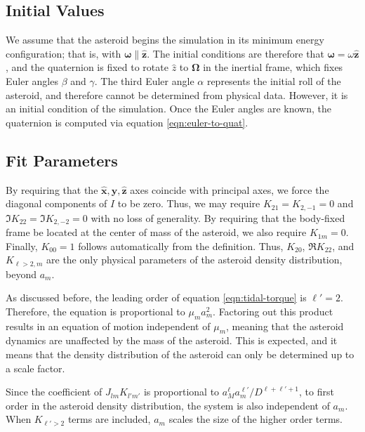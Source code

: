\documentclass[11pt]{article}
\newcommand{\unit}[1]{\hat{\mathbf{#1}}}
\begin{document}
\subsection{Initial Values}
We assume that the asteroid begins the simulation in its minimum energy configuration; that is, with $\bm \omega \parallel \unit z$. The initial conditions are therefore that $\bm \omega = \omega \unit z$, and the quaternion is fixed to rotate $\hat z$ to $\bm \Omega$ in the inertial frame, which fixes Euler angles $\beta$ and $\gamma$. The third Euler angle $\alpha$ represents the initial roll of the asteroid, and therefore cannot be determined from physical data. However, it is an initial condition of the simulation. Once the Euler angles are known, the quaternion is computed via equation \ref{eqn:euler-to-quat}.


\subsection{Fit Parameters}
By requiring that the $\unit x, \unit y, \unit z$ axes coincide with principal axes, we force the diagonal components of $I$ to be zero. Thus, we may require $K_{21}=K_{2,-1}=0$ and $\Im K_{22}=\Im K_{2,-2}=0$ with no loss of generality. By requiring that the body-fixed frame be located at the center of mass of the asteroid, we also require $K_{1m}=0$. Finally, $K_{00}=1$ follows automatically from the definition. Thus, $K_{20}$, $\Re K_{22}$, and $K_{\ell>2, m}$ are the only physical parameters of the asteroid density distribution, beyond $a_m$.

As discussed before, the leading order of equation \ref{eqn:tidal-torque} is $\ell' = 2$. Therefore, the equation is proportional to $\mu_m a_m^2$. Factoring out this product results in an equation of motion independent of $\mu_m$, meaning that the asteroid dynamics are unaffected by the mass of the asteroid. This is expected, and it means that the density distribution of the asteroid can only be determined up to a scale factor.

Since the coefficient of $J_{lm}K_{l'm'}$ is proportional to $a_M^\ell a_m^{\ell'} / D^{\ell+\ell'+1}$, to first order in the asteroid density distribution, the system is also independent of $a_m$. When $K_{\ell' > 2}$ terms are included, $a_m$ scales the size of the higher order terms.
\end{document}
